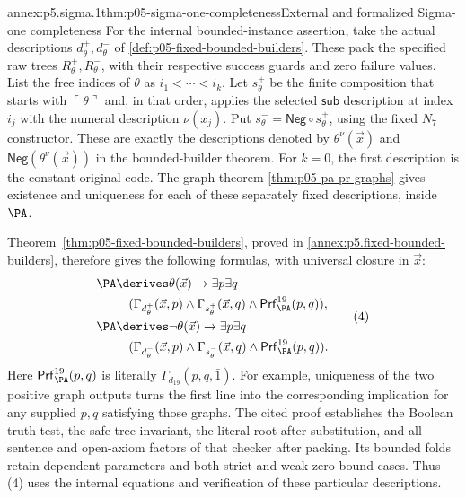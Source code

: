 \begin{annexitem}{annex:p5.sigma.1}{thm:p05-sigma-one-completeness}{External and formalized Sigma-one completeness}
For the internal bounded-instance assertion, take the actual descriptions
\(d_\theta^+,d_\theta^-\) of
\cref{def:p05-fixed-bounded-builders}. These pack the specified raw trees
\(R_\theta^+,R_\theta^-\), with their respective success guards and zero
failure values. List the free indices of \(\theta\) as
\(i_1<\cdots<i_k\). Let \(s_\theta^+\) be the finite composition that
starts with \(\ulcorner\theta\urcorner\) and, in that order, applies
the selected \(\mathsf{sub}\) description at index \(i_j\) with the
numeral description \(\nu(x_j)\). Put
\(s_\theta^-=\mathsf{Neg}\circ s_\theta^+\), using the fixed
\(N_7\) constructor. These are exactly the descriptions denoted by
\(\theta^\nu(\vec x)\) and
\(\mathsf{Neg}(\theta^\nu(\vec x))\) in the bounded-builder theorem.
For \(k=0\), the first description is the constant original code.
The graph theorem \cref{thm:p05-pa-pr-graphs} gives existence and uniqueness
for each of these separately fixed descriptions, inside \(\PA\).

Theorem~\ref{thm:p05-fixed-bounded-builders}, proved in
\cref{annex:p5.fixed-bounded-builders}, therefore gives the following
formulas, with universal closure in \(\vec x\):
\[
\begin{aligned}
 \PA&\derives\theta(\vec x)\to\exists p\exists q\,\\
 &\quad(\Gamma_{d_\theta^+}(\vec x,p)\land
   \Gamma_{s_\theta^+}(\vec x,q)\land
   \mathsf{Prf}^{19}_{\PA}(p,q)),\\
 \PA&\derives\neg\theta(\vec x)\to\exists p\exists q\,\\
 &\quad(\Gamma_{d_\theta^-}(\vec x,p)\land
   \Gamma_{s_\theta^-}(\vec x,q)\land
   \mathsf{Prf}^{19}_{\PA}(p,q)).
\end{aligned}
\tag{4}
\]
Here \(\mathsf{Prf}^{19}_{\PA}(p,q)\) is literally
\(\Gamma_{d_{19}}(p,q,\bar1)\). For example, uniqueness of the two
positive graph outputs turns the first line into the corresponding
implication for any supplied \(p,q\) satisfying those graphs. The cited
proof establishes the Boolean truth test, the safe-tree invariant, the
literal root after substitution, and all sentence and open-axiom factors
of that checker after packing. Its bounded folds retain dependent
parameters and both strict and weak zero-bound cases. Thus (4) uses the
internal equations and verification of these particular descriptions.


\end{annexitem}
